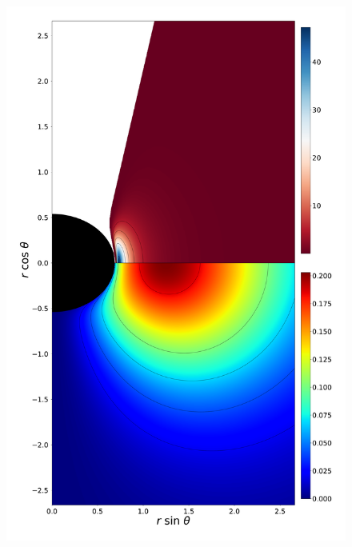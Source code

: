 \documentclass[twocolumn,aps,showpacs,showkeys,prd,superscriptaddress,byrevtex, amsmath]{revtex4-1}
\begin{document}
\begin{figure}
\includegraphics[scale=0.12]{figures/fig6_IV__10.pdf}
\hspace{-0.4cm}

\end{figure}
\end{document}
